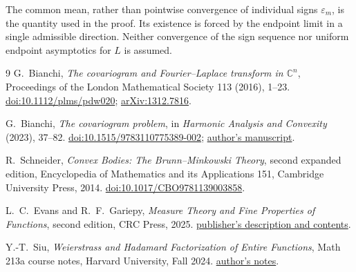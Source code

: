 \documentclass[11pt,a4paper]{article}
\theoremstyle{definition}
\theoremstyle{remark}
\numberwithin{equation}{section}
\begin{document}
The common mean, rather than pointwise convergence of individual signs
$\varepsilon_m$, is the quantity used in the proof. Its existence is forced
by the endpoint limit in a single admissible direction. Neither convergence
of the sign sequence nor uniform endpoint asymptotics for $L$ is assumed.
\begin{thebibliography}{9}
G.~Bianchi, \emph{The covariogram and Fourier--Laplace transform in
$\mathbb C^n$}, Proceedings of the London Mathematical Society
113 (2016), 1--23.
\href{https://doi.org/10.1112/plms/pdw020}{doi:10.1112/plms/pdw020};
\href{https://arxiv.org/abs/1312.7816}{arXiv:1312.7816}.

G.~Bianchi, \emph{The covariogram problem}, in
\emph{Harmonic Analysis and Convexity} (2023), 37--82.
\href{https://doi.org/10.1515/9783110775389-002}{doi:10.1515/9783110775389-002};
\href{https://people.dimai.unifi.it/bianchi/lavori/covariogram_survey14.pdf}{author's manuscript}.

R.~Schneider, \emph{Convex Bodies: The Brunn--Minkowski Theory},
second expanded edition, Encyclopedia of Mathematics and its Applications
151, Cambridge University Press, 2014.
\href{https://doi.org/10.1017/CBO9781139003858}{doi:10.1017/CBO9781139003858}.

L.~C.~Evans and R.~F.~Gariepy, \emph{Measure Theory and Fine Properties
of Functions}, second edition, CRC Press, 2025.
\href{https://www.routledge.com/Measure-Theory-and-Fine-Properties-of-Functions/Evans/p/book/9781032946443}{publisher's description and contents}.

Y.-T.~Siu, \emph{Weierstrass and Hadamard Factorization of Entire Functions},
Math 213a course notes, Harvard University, Fall 2024.
\href{https://people.math.harvard.edu/~siu/math213a/weierstrass_and_hadamard_factorization_of_entire_function.pdf}{author's notes}.
\end{thebibliography}
\end{document}
